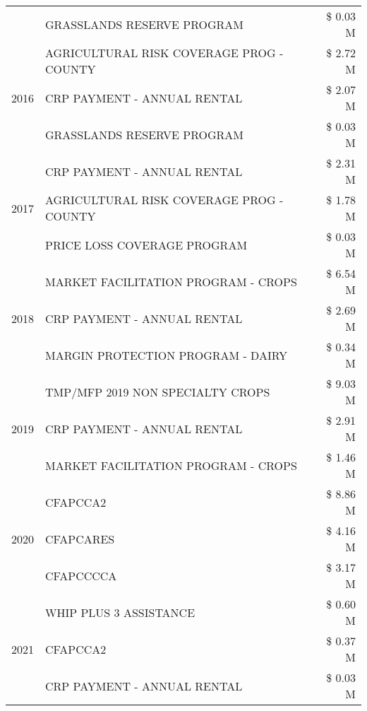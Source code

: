 \begin{tabular}{llr}
 & GRASSLANDS RESERVE PROGRAM & \$ 0.03 M \\
\cline{1-3}
\multirow[t]{3}{*}{2016} & AGRICULTURAL RISK COVERAGE PROG - COUNTY & \$ 2.72 M \\
 & CRP PAYMENT - ANNUAL RENTAL & \$ 2.07 M \\
 & GRASSLANDS RESERVE PROGRAM & \$ 0.03 M \\
\cline{1-3}
\multirow[t]{3}{*}{2017} & CRP PAYMENT - ANNUAL RENTAL & \$ 2.31 M \\
 & AGRICULTURAL RISK COVERAGE PROG - COUNTY & \$ 1.78 M \\
 & PRICE LOSS COVERAGE PROGRAM & \$ 0.03 M \\
\cline{1-3}
\multirow[t]{3}{*}{2018} & MARKET FACILITATION PROGRAM - CROPS & \$ 6.54 M \\
 & CRP PAYMENT - ANNUAL RENTAL & \$ 2.69 M \\
 & MARGIN PROTECTION PROGRAM - DAIRY & \$ 0.34 M \\
\cline{1-3}
\multirow[t]{3}{*}{2019} & TMP/MFP 2019 NON SPECIALTY CROPS & \$ 9.03 M \\
 & CRP PAYMENT - ANNUAL RENTAL & \$ 2.91 M \\
 & MARKET FACILITATION PROGRAM - CROPS & \$ 1.46 M \\
\cline{1-3}
\multirow[t]{3}{*}{2020} & CFAPCCA2 & \$ 8.86 M \\
 & CFAPCARES & \$ 4.16 M \\
 & CFAPCCCCA & \$ 3.17 M \\
\cline{1-3}
\multirow[t]{3}{*}{2021} & WHIP PLUS 3 ASSISTANCE & \$ 0.60 M \\
 & CFAPCCA2 & \$ 0.37 M \\
 & CRP PAYMENT - ANNUAL RENTAL & \$ 0.03 M \\
\cline{1-3}
\bottomrule
\end{tabular}
